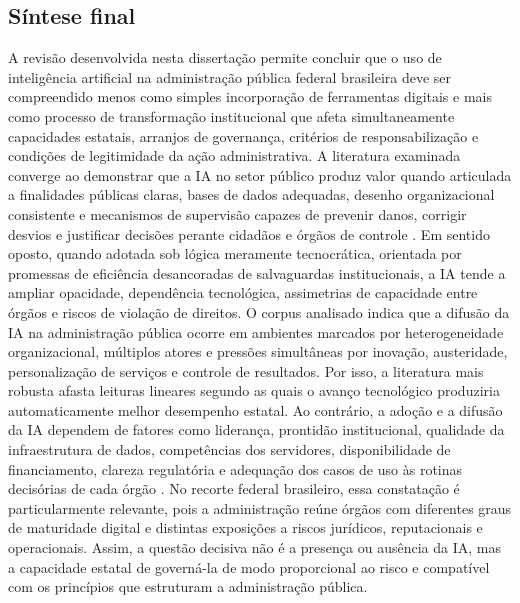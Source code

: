 \documentclass[12pt,a4paper]{article}
\begin{document}
\subsection{Síntese final}
\label{sec:orge67c198}
A revisão desenvolvida nesta dissertação permite concluir que o uso de inteligência artificial na administração pública federal brasileira deve ser compreendido menos como simples incorporação de ferramentas digitais e mais como processo de transformação institucional que afeta simultaneamente capacidades estatais, arranjos de governança, critérios de responsabilização e condições de legitimidade da ação administrativa. A literatura examinada converge ao demonstrar que a IA no setor público produz valor quando articulada a finalidades públicas claras, bases de dados adequadas, desenho organizacional consistente e mecanismos de supervisão capazes de prevenir danos, corrigir desvios e justificar decisões perante cidadãos e órgãos de controle \autocite{madan2022ai} \autocite{criado2024artificial} \autocite{serra2024a}. Em sentido oposto, quando adotada sob lógica meramente tecnocrática, orientada por promessas de eficiência desancoradas de salvaguardas institucionais, a IA tende a ampliar opacidade, dependência tecnológica, assimetrias de capacidade entre órgãos e riscos de violação de direitos.
O corpus analisado indica que a difusão da IA na administração pública ocorre em ambientes marcados por heterogeneidade organizacional, múltiplos atores e pressões simultâneas por inovação, austeridade, personalização de serviços e controle de resultados. Por isso, a literatura mais robusta afasta leituras lineares segundo as quais o avanço tecnológico produziria automaticamente melhor desempenho estatal. Ao contrário, a adoção e a difusão da IA dependem de fatores como liderança, prontidão institucional, qualidade da infraestrutura de dados, competências dos servidores, disponibilidade de financiamento, clareza regulatória e adequação dos casos de uso às rotinas decisórias de cada órgão \autocite{madan2022ai} \autocite{sharma2021implementing} \autocite{david2023understanding}. No recorte federal brasileiro, essa constatação é particularmente relevante, pois a administração reúne órgãos com diferentes graus de maturidade digital e distintas exposições a riscos jurídicos, reputacionais e operacionais. Assim, a questão decisiva não é a presença ou ausência da IA, mas a capacidade estatal de governá-la de modo proporcional ao risco e compatível com os princípios que estruturam a administração pública.
\end{document}
